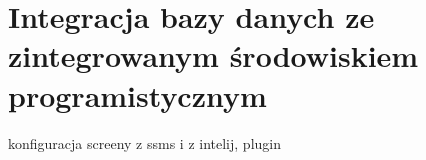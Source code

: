 \chapter{Integracja bazy danych ze zintegrowanym środowiskiem programistycznym}


konfiguracja screeny z ssms i z intelij, plugin
